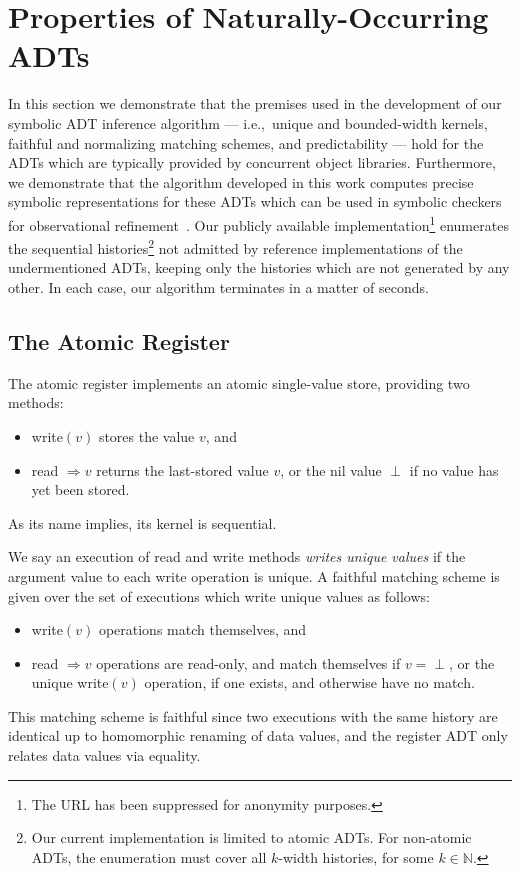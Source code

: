 \section{Properties of Naturally-Occurring ADTs}
\label{sec:nature}

\makeatletter
\renewcommand{\verbatim@font}{\ttfamily\scriptsize}
\makeatother

In this section we demonstrate that the premises used in the development of our
symbolic ADT inference algorithm — i.e.,~unique and bounded-width kernels,
faithful and normalizing matching schemes, and predictability — hold for the
ADTs which are typically provided by concurrent object libraries. Furthermore,
we demonstrate that the algorithm developed in this work computes precise
symbolic representations for these ADTs which can be used in symbolic checkers
for observational refinement~\cite{conf/pldi/EmmiEH15}. Our publicly available
implementation\footnote{The URL has been suppressed for anonymity purposes.}
enumerates the sequential histories\footnote{Our current implementation is
limited to atomic ADTs. For non-atomic ADTs, the enumeration must cover all
$k$-width histories, for some $k \in \mathbb{N}$.} not admitted by reference
implementations of the undermentioned ADTs, keeping only the histories which
are not generated by any other. In each case, our algorithm terminates in a
matter of seconds.

\subsection{The Atomic Register}

The atomic register implements an atomic single-value store, providing two
methods:
\begin{itemize}

  \item write$(v)$ stores the value $v$, and

  \item read $\Rightarrow v$ returns the last-stored value $v$, or the nil
  value $\perp$ if no value has yet been stored.

\end{itemize}
As its name implies, its kernel is sequential.

We say an execution of read and write methods \emph{writes unique values} if
the argument value to each write operation is unique. A faithful matching
scheme is given over the set of executions which write unique values as follows:
\begin{itemize}

  \item write$(v)$ operations match themselves, and

  \item read $\Rightarrow v$ operations are read-only, and match themselves if
  $v = \perp$, or the unique write$(v)$ operation, if one exists, and otherwise 
  have no match.

\end{itemize}
This matching scheme is faithful since two executions with the same history
are identical up to homomorphic renaming of data values, and the register ADT
only relates data values via equality.


